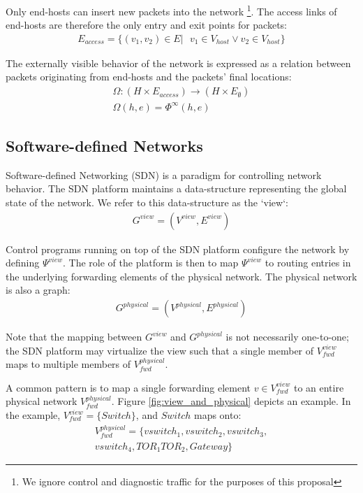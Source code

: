 \documentclass{sig-alternate-10pt}
\begin{document}
Only end-hosts can insert new packets into the network \footnote{We ignore
control and diagnostic traffic for the purposes of this proposal}. The access links
of end-hosts are therefore the only entry and exit points for packets:
\begin{align*}
E_{access} = \{ (v_1,v_2) \in E |\text{ } v_1 \in V_{host} \vee v_2 \in V_{host} \}
\end{align*}

The externally visible behavior of the network is expressed as a relation between
packets originating from end-hosts and the packets' final locations:
\begin{align*}
\Omega: (H \times E_{access}) \rightarrow (H \times E_{\emptyset}) \\
\Omega(h,e) = \Phi^{\infty}(h,e)
\end{align*}

\subsection{Software-defined Networks}

Software-defined Networking (SDN) is a paradigm for controlling network behavior.
The SDN platform maintains a data-structure representing the global state of the
network. We refer to this data-structure as the `view`:
\begin{align*}
G^{view} = (V^{view},E^{view})
\end{align*}

Control programs running on top of the SDN platform configure the network by
defining $\Psi^{view}$. The role of the platform is then to map $\Psi^{view}$ to
routing entries in the underlying forwarding elements of the
physical network. The physical network is also a graph:
\begin{align*}
G^{physical} = (V^{physical}, E^{physical}) 
\end{align*}

Note that the mapping between $G^{view}$ and $G^{physical}$ is not
necessarily one-to-one; the SDN platform may virtualize the view
such that a single member of $V_{fwd}^{view}$ maps to multiple members of
$V_{fwd}^{physical}$.

A common pattern is to map a single forwarding element $v \in V_{fwd}^{view}$ to
an entire physical network $V_{fwd}^{physical}$. Figure \ref{fig:view_and_physical}
depicts an example. In the example, $V_{fwd}^{view} = \{ Switch \}$, and
$Switch$ maps onto:
\begin{align*}
V_{fwd}^{physical} = \{ vswitch_1, vswitch_2, vswitch_3, \\
vswitch_4, TOR_1 TOR_2, Gateway \}
\end{align*}
\end{document}
